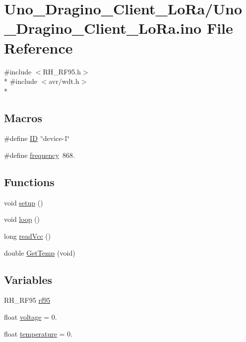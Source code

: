 \hypertarget{Uno__Dragino__Client__LoRa_8ino}{\section{Uno\-\_\-\-Dragino\-\_\-\-Client\-\_\-\-Lo\-Ra/\-Uno\-\_\-\-Dragino\-\_\-\-Client\-\_\-\-Lo\-Ra.ino File Reference}
\label{Uno__Dragino__Client__LoRa_8ino}
}
{\ttfamily \#include $<$R\-H\-\_\-\-R\-F95.\-h$>$}\\*
{\ttfamily \#include $<$avr/wdt.\-h$>$}\\*
\subsection*{Macros}
\begin{DoxyCompactItemize}
\item 
\#define \hyperlink{Uno__Dragino__Client__LoRa_8ino_a77ceac8d6af195fe72f95f6afd87c45e}{I\-D}~\char`\"{}device-\/1\char`\"{}
\item 
\#define \hyperlink{Uno__Dragino__Client__LoRa_8ino_a6556f9ceceffdd10267822cefcb49ea5}{frequency}~868.
\end{DoxyCompactItemize}
\subsection*{Functions}
\begin{DoxyCompactItemize}
\item 
void \hyperlink{Uno__Dragino__Client__LoRa_8ino_a4fc01d736fe50cf5b977f755b675f11d}{setup} ()
\item 
void \hyperlink{Uno__Dragino__Client__LoRa_8ino_afe461d27b9c48d5921c00d521181f12f}{loop} ()
\item 
long \hyperlink{Uno__Dragino__Client__LoRa_8ino_a8e23c9421f6663303ea22e4969e2f6c1}{read\-Vcc} ()
\item 
double \hyperlink{Uno__Dragino__Client__LoRa_8ino_a0a60fd2316c16170dc7aa6aa0f5f485d}{Get\-Temp} (void)
\end{DoxyCompactItemize}
\subsection*{Variables}
\begin{DoxyCompactItemize}
\item 
R\-H\-\_\-\-R\-F95 \hyperlink{Uno__Dragino__Client__LoRa_8ino_ac741fa4056d5cbbcc0ab38fa7d8c6ce3}{rf95}
\item 
float \hyperlink{Uno__Dragino__Client__LoRa_8ino_a47061fcae597f83f8a0a99d4b7b5a5c1}{voltage} = 0.
\item 
float \hyperlink{Uno__Dragino__Client__LoRa_8ino_afc1d28cfbce795d6ea954ebe725241f5}{temperature} = 0.
\end{DoxyCompactItemize}


